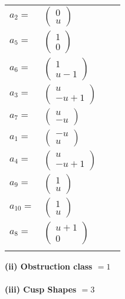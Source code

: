 \documentclass[1p]{elsarticle_modified}
\theoremstyle{definition}
\begin{document}
\begin{tabular}{m{7pt} m{180pt} m{7pt} m{180pt} }
\flushright $a_{2}=$&$\begin{pmatrix}0\\u\end{pmatrix}$ \\
\flushright $a_{5}=$&$\begin{pmatrix}1\\0\end{pmatrix}$ \\
\flushright $a_{6}=$&$\begin{pmatrix}1\\u-1\end{pmatrix}$ \\
\flushright $a_{3}=$&$\begin{pmatrix}u\\- u+1\end{pmatrix}$ \\
\flushright $a_{7}=$&$\begin{pmatrix}u\\- u\end{pmatrix}$ \\
\flushright $a_{1}=$&$\begin{pmatrix}- u\\u\end{pmatrix}$ \\
\flushright $a_{4}=$&$\begin{pmatrix}u\\- u+1\end{pmatrix}$ \\
\flushright $a_{9}=$&$\begin{pmatrix}1\\u\end{pmatrix}$ \\
\flushright $a_{10}=$&$\begin{pmatrix}1\\u\end{pmatrix}$ \\
\flushright $a_{8}=$&$\begin{pmatrix}u+1\\0\end{pmatrix}$\\&\end{tabular}
\flushleft \textbf{(ii) Obstruction class $= 1$}\\~\\
\flushleft \textbf{(iii) Cusp Shapes $= 3$}\\~\\
\end{document}
